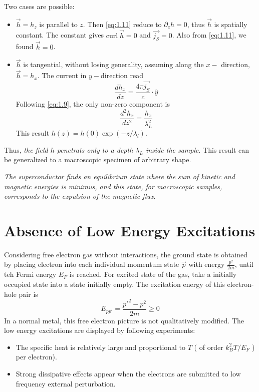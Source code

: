 Two cases are possible:
\begin{itemize}
 \item $\vec{h} = h_z$ is parallel to $z$. Then \eqref{eq:1.11} reduce to $\partial_z h=0$, thus $\vec{h}$ is spatially constant. The constant gives $\mathrm{curl~} \vec{h} = 0$ and $\vec{j_S}=0$.
 Also from \eqref{eq:1.11}, we found $\vec{h} = 0$.
 \item $\vec{h}$ is tangential, without losing generality, assuming along the $x-$ direction, $\vec{h} = h_x$.
 The current in $y-$direction read
 \begin{equation}
  \frac{d h_x}{d z} = \frac{4\pi \vec{j_S}}{c} \cdot \hat{y}
  \label{eq:1.12}
 \end{equation}
 Following \eqref{eq:1.9}, the only non-zero component is
 \begin{equation}
  \frac{d^2 h_x}{dz^2} = \frac{h_x}{\lambda_L^2}
  \label{eq:1.14}
 \end{equation}
 This result  $h(z) = h(0) \exp\left( -z/\lambda_l \right)$.
\end{itemize}
Thus, \textit{the field $h$ penetrats only to a depth $\lambda_L$ inside the sample}.
This result can be generalized to a macroscopic specimen of arbitrary shape.

\textit{The superconductor finds an equilibrium state where the sum of kinetic and magnetic energies is minimus, and this state, for macroscopic samples, corresponds to the expulsion of the magnetic flux}.

\section{Absence of Low Energy Excitations}\label{sec:1.3}
Considering free electron gas without interactions, the ground state is obtained by placing electron into each individual momentum state $\vec{p}$ with energy $\frac{p^2}{2m}$, until teh Fermi energy $E_F$ is reached.
For excited state of the gas, take a initially occupied state into a state initially empty.
The excitation energy of this electron-hole pair is
\begin{equation}
 E_{pp'} = \frac{p'^2 - p^2}{2m} \geq 0
 \label{eq:1.16}
\end{equation}
In a normal metal, this free electron picture is not qualitatively modified.
The low energy excitations are displayed by following experiments:
\begin{itemize}
 \item The specific heat is relatively large and proportional to $T$ ( of order $k_B^2 T/E_F$ ) per electron).
 \item Strong dissipative effects appear when the electrons are submitted to low frequency external perturbation.
\end{itemize}

